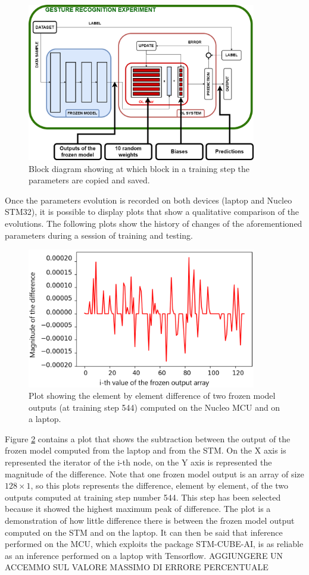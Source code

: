 \documentclass[12pt]{report}
\begin{document}
\begin{figure}[h!]
    \centering
    \includegraphics[width=100mm]{Figures/Chapter5/evolution.png} 
    \caption{Block diagram showing at which block in a training step the parameters are copied and saved.}
    \label{fig:evolution_params}    
\end{figure}

Once the parameters evolution is recorded on both devices (laptop and Nucleo STM32), it is possible to display plots that show a qualitative comparison of the evolutions. The following plots show the history of changes of the aforementioned parameters during a session of training and testing.

\begin{figure}[h!]
    \centering
    \includegraphics[width=100mm]{Figures/Chapter5/frozen_example.png} 
    \caption{Plot showing the element by element difference of two frozen model outputs (at training step 544) computed on the Nucleo MCU and on a laptop.}
    \label{fig:comparison_frozen}    
\end{figure}

Figure \ref{fig:comparison_frozen} contains a plot that shows the subtraction between the output of the frozen model computed from the laptop and from the STM. On the X axis is represented the iterator of the i-th node, on the Y axis is represented the magnitude of the difference. Note that one frozen model output is an array of size $128 \times 1$, so this plots represents the difference, element by element, of the two outputs computed at training step number 544. This step has been selected because it showed the highest maximum peak of difference. The plot is a demonstration of how little difference there is between the frozen model output computed on the STM and on the laptop. It can then be said that inference performed on the MCU, which exploits the package STM-CUBE-AI, is as reliable as an inference performed on a laptop with Tensorflow.
AGGIUNGERE UN ACCEMMO SUL VALORE MASSIMO DI ERRORE PERCENTUALE
\end{document}
